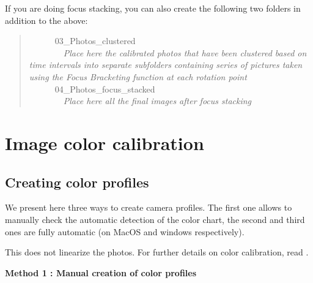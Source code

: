 \documentclass[
]{book}
\begin{document}
\hfill\break

If you are doing focus stacking, you can also create the following two folders in addition to the above:

\begin{quote}
   03\_Photos\_clustered\\
    \emph{Place here the calibrated photos that have been clustered based on time intervals into separate subfolders containing series of pictures taken using the Focus Bracketing function at each rotation point}\\
   04\_Photos\_focus\_stacked\\
    \emph{Place here all the final images after focus stacking}\\
\end{quote}

\hypertarget{image-color-calibration}{%
\section{Image color calibration}\label{image-color-calibration}}

\hypertarget{creating-color-profiles}{%
\subsection{Creating color profiles}\label{creating-color-profiles}}

We present here three ways to create camera profiles. The first one
allows to manually check the automatic detection of the color chart, the
second and third ones are fully automatic (on MacOS and windows
respectively).

This does not linearize the photos. For further details on color
calibration, read \citet{troscianko2015image}.

\textbf{Method 1 : Manual creation of color profiles}
\end{document}
